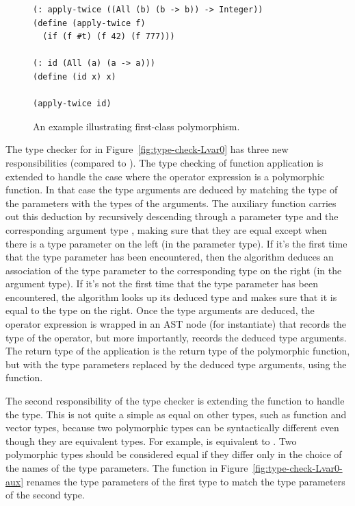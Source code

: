 \documentclass[7x10,nocrop]{TimesAPriori_MIT}%
\begin{document}
\begin{figure}[tbp]
\begin{lstlisting}
(: apply-twice ((All (b) (b -> b)) -> Integer))
(define (apply-twice f)
  (if (f #t) (f 42) (f 777)))

(: id (All (a) (a -> a)))
(define (id x) x)

(apply-twice id)
\end{lstlisting}
\caption{An example illustrating first-class polymorphism.}
\label{fig:apply-twice}
\end{figure}

The type checker for \LangPoly{} in Figure~\ref{fig:type-check-Lvar0} has
three new responsibilities (compared to \LangLoop{}). The type checking of
function application is extended to handle the case where the operator
expression is a polymorphic function. In that case the type arguments
are deduced by matching the type of the parameters with the types of
the arguments.
%
The  auxiliary function carries out this deduction
by recursively descending through a parameter type  and the
corresponding argument type , making sure that they are equal
except when there is a type parameter on the left (in the parameter
type). If it's the first time that the type parameter has been
encountered, then the algorithm deduces an association of the type
parameter to the corresponding type on the right (in the argument
type). If it's not the first time that the type parameter has been
encountered, the algorithm looks up its deduced type and makes sure
that it is equal to the type on the right.
%
Once the type arguments are deduced, the operator expression is
wrapped in an  AST node (for instantiate) that records the
type of the operator, but more importantly, records the deduced type
arguments. The return type of the application is the return type of
the polymorphic function, but with the type parameters replaced by the
deduced type arguments, using the  function.

The second responsibility of the type checker is extending the
function  to handle the  type.  This is
not quite a simple as equal on other types, such as function and
vector types, because two polymorphic types can be syntactically
different even though they are equivalent types. For example,
 is equivalent to .
Two polymorphic types should be considered equal if they differ only
in the choice of the names of the type parameters. The
 function in Figure~\ref{fig:type-check-Lvar0-aux}
renames the type parameters of the first type to match the type
parameters of the second type.
\end{document}
